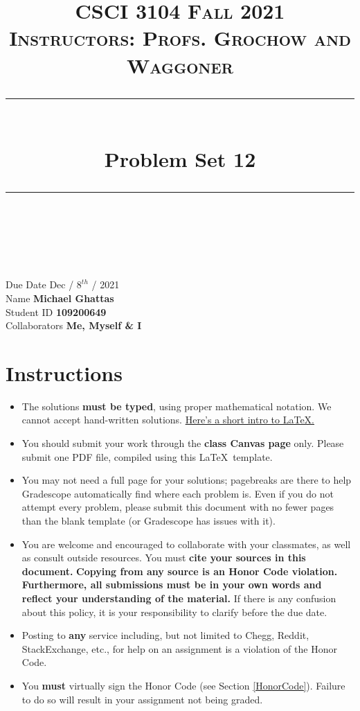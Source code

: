 \documentclass[11pt]{article}
\title{
\normalfont \normalsize 
\textsc{CSCI 3104 Fall 2021 \\ 
Instructors: Profs. Grochow and Waggoner} \\
[10pt] 
\rule{\linewidth}{0.5pt} \\[6pt] 
\huge Problem Set 12 \\
\rule{\linewidth}{2pt}  \\[10pt]
}
\date{}
\theoremstyle{definition}
\theoremstyle{definition}
\theoremstyle{definition}
\begin{document}
\maketitle


\noindent
Due Date \dotfill Dec / $8^{th}$ / 2021 \\
Name \dotfill \textbf{Michael Ghattas} \\
Student ID \dotfill \textbf{109200649} \\
Collaborators \dotfill \textbf{Me, Myself \& I}

\tableofcontents

\section{Instructions}
 \begin{itemize}
	\item The solutions \textbf{must be typed}, using proper mathematical notation. We cannot accept hand-written solutions. \href{http://ece.uprm.edu/~caceros/latex/introduction.pdf}{Here's a short intro to \LaTeX.}
	\item You should submit your work through the \textbf{class Canvas page} only. Please submit one PDF file, compiled using this \LaTeX \ template.
	\item You may not need a full page for your solutions; pagebreaks are there to help Gradescope automatically find where each problem is. Even if you do not attempt every problem, please submit this document with no fewer pages than the blank template (or Gradescope has issues with it).

	\item You are welcome and encouraged to collaborate with your classmates, as well as consult outside resources. You must \textbf{cite your sources in this document.} \textbf{Copying from any source is an Honor Code violation. Furthermore, all submissions must be in your own words and reflect your understanding of the material.} If there is any confusion about this policy, it is your responsibility to clarify before the due date. 

	\item Posting to \textbf{any} service including, but not limited to Chegg, Reddit, StackExchange, etc., for help on an assignment is a violation of the Honor Code.

	\item You \textbf{must} virtually sign the Honor Code (see Section \ref{HonorCode}). Failure to do so will result in your assignment not being graded.
\end{itemize}
\end{document}
